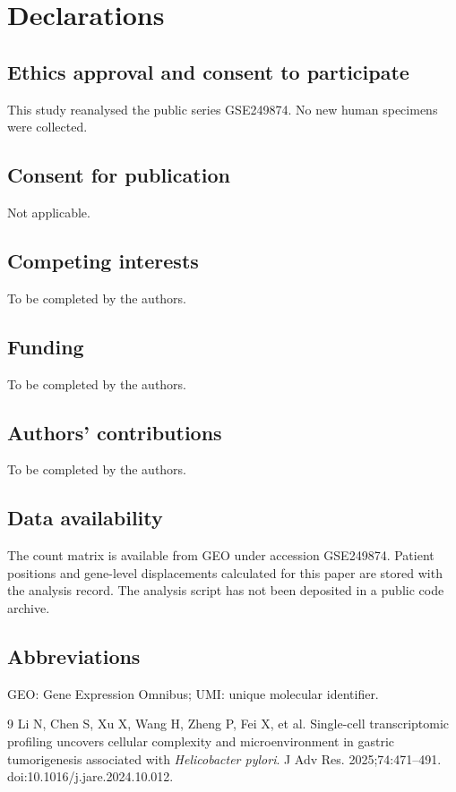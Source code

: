 \documentclass[11pt,a4paper]{article}
\begin{document}
\section*{Declarations}

\subsection*{Ethics approval and consent to participate}
This study reanalysed the public series GSE249874. No new human specimens were collected.

\subsection*{Consent for publication}
Not applicable.

\subsection*{Competing interests}
To be completed by the authors.

\subsection*{Funding}
To be completed by the authors.

\subsection*{Authors' contributions}
To be completed by the authors.

\subsection*{Data availability}
The count matrix is available from GEO under accession GSE249874. Patient positions and gene-level displacements calculated for this paper are stored with the analysis record. The analysis script has not been deposited in a public code archive.

\subsection*{Abbreviations}
GEO: Gene Expression Omnibus; UMI: unique molecular identifier.

\begin{thebibliography}{9}
Li N, Chen S, Xu X, Wang H, Zheng P, Fei X, et al.
Single-cell transcriptomic profiling uncovers cellular complexity and microenvironment in gastric tumorigenesis associated with \textit{Helicobacter pylori}.
J Adv Res. 2025;74:471--491.
doi:10.1016/j.jare.2024.10.012.
\end{thebibliography}
\end{document}
